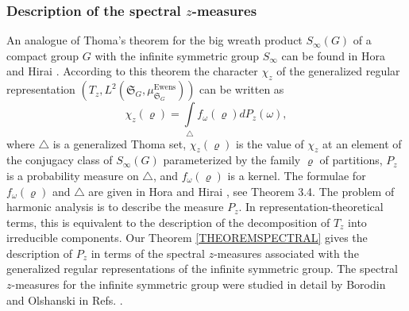 \documentclass[12pt]{amsart}
\theoremstyle{definition}
\numberwithin{equation}{section}
\DeclareMathOperator{\Ewens}{Ewens}
\begin{document}
\subsubsection{Description of the spectral $z$-measures}
An analogue of Thoma's theorem \cite{Thoma} for the big wreath product $S_{\infty}(G)$ of a compact group $G$ with the infinite symmetric  group $S_{\infty}$ can be found in Hora and Hirai \cite{HoraHirai}. According to this theorem the character $\chi_z$ of the generalized  regular representation $\left(T_z,L^2\left(\mathfrak{S}_G,\mu_{\mathfrak{S}_G}^{\Ewens}\right)\right)$
can be written as
\begin{equation}\label{ZcharacterRepresentation}
\chi_z(\varrho)=\int\limits_{\triangle}f_{\omega}(\varrho)dP_z(\omega),
\end{equation}
where $\triangle$ is a generalized Thoma set, $\chi_z(\varrho)$ is the value of $\chi_z$ at an element of the conjugacy class of $S_{\infty}(G)$
parameterized by the family $\varrho$ of partitions,  $P_z$ is a probability measure on $\triangle$, and $f_{\omega}(\varrho)$ is a kernel. The formulae for $f_{\omega}(\varrho)$ and $\triangle$ are given in Hora and Hirai \cite{HoraHirai}, see Theorem 3.4. The problem of harmonic analysis is to describe the measure $P_z$. In representation-theoretical terms, this is equivalent to the description of the decomposition of $T_z$ into irreducible components.
Our Theorem \ref{THEOREMSPECTRAL} gives the description of $P_z$ in terms of the spectral $z$-measures associated with the generalized regular representations of the infinite symmetric group. The spectral $z$-measures for the infinite symmetric group were studied in detail by Borodin and Olshanski in Refs. \cite{Borodin1, Borodin2, BorodinOlshanskiLetters}.
\end{document}
